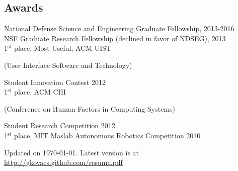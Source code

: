 \documentclass[margin,line]{resume}
\begin{document}
\begin{resume}
\section{\mysidestyle Awards}

National Defense Science and Engineering Graduate Fellowship, 2013-2016\\
NSF Graduate Research Fellowship (declined in favor of NDSEG), 2013 \\
1$^{\textrm{st}}$ place, Most Useful, ACM UIST \begin{small}(User Interface Software and Technology)\end{small} Student Innovation Contest 2012\\
1$^{\textrm{st}}$ place, ACM CHI \begin{small}(Conference on Human Factors in Computing Systems)\end{small} Student Research Competition 2012\\
1$^{\textrm{st}}$ place, MIT Maslab Autonomous Robotics Competition 2010

\vspace{-3mm}

\begin{small}
\begin{center}
Updated on \today. Latest version is at \url{http://gkovacs.github.com/resume.pdf}
\end{center}
\end{small}

\end{resume}
\end{document}
